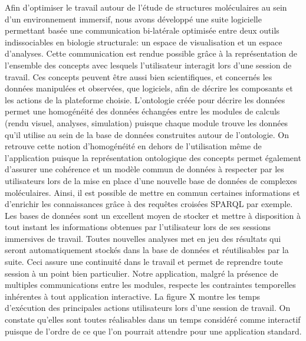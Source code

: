 Afin d'optimiser le travail autour de l'étude de structures moléculaires au sein d'un environnement immersif, nous avons développé une suite logicielle permettant basée une communication bi-latérale optimisée entre deux outils indissociables en biologie structurale: un espace de visualisation et un espace d'analyses. Cette communication est rendue possible grâce à la représentation de l'ensemble des concepts avec lesquels l'utilisateur interagit lors d'une session de travail. Ces concepts peuvent être aussi bien scientifiques, et concernés les données manipulées et observées, que logiciels, afin de décrire les composants et les actions de la plateforme choisie. L'ontologie créée pour décrire les données permet une homogénéité des données échangées entre les modules de calculs (rendu visuel, analyses, simulation) puisque chaque module trouve les données qu'il utilise au sein de la base de données construites autour de l'ontologie. On retrouve cette notion d'homogénéité en dehors de l'utilisation même de l'application puisque la représentation ontologique des concepts permet également d'assurer une cohérence et un modèle commun de données à respecter par les utilisateurs lors de la mise en place d'une nouvelle base de données de complexes moléculaires. Ainsi, il est possible de mettre en commun certaines informations et d'enrichir les connaissances grâce à des requêtes croisées SPARQL par exemple. Les bases de données sont un excellent moyen de stocker et mettre à disposition à tout instant les informations obtenues par l'utilisateur lors de ses sessions immersives de travail. Toutes nouvelles analyses met en jeu des résultats qui seront automatiquement stockés dans la base de données et réutilisables par la suite. Ceci assure une continuité dans le travail et permet de reprendre toute session à un point bien particulier.
Notre application, malgré la présence de multiples communications entre les modules, respecte les contraintes temporelles inhérentes à tout application interactive. La figure X montre les temps d'exécution des principales actions utilisateurs lors d'une session de travail. On constate qu'elles sont toutes réalisables dans un temps considéré comme interactif puisque de l'ordre de ce que l'on pourrait attendre pour une application standard.



